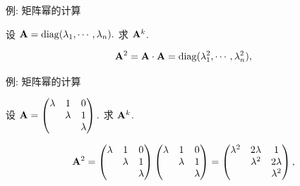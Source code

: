 \begin{frame}{例: 矩阵幂的计算}
	\onslide<+->
	\begin{example}
		设
		${\mathbf{A}}={\mathrm{diag}}(\lambda_1,\cdots,\lambda_n).$
		求 ${\mathbf{A}}^k$.
	\end{example}
	\onslide<+->
	\begin{solution}
		\[{\mathbf{A}}^2={\mathbf{A}}\cdot{\mathbf{A}}={\mathrm{diag}}(\lambda_1^2,\cdots,\lambda_n^2),\]
		\onslide<+->{%
			\[\bfA^3=\bfA\cdot\bfA^2=\diag(\lambda_1^3,\cdots,\lambda_n^3),\]
		}\onslide<+->{%
			递推下去可知
			\[\bfA^k=\diag(\lambda_1^k,\cdots,\lambda_n^k).\]
		}
	\end{solution}
\end{frame}


\begin{frame}{例: 矩阵幂的计算}\small
\beqskip{0pt}
	\onslide<+->
	\begin{example}
		设 ${\mathbf{A}}=\begin{pmatrix}
			\lambda&1&0\\
			&\lambda&1\\
			&&\lambda
		\end{pmatrix}.$
		求 ${\mathbf{A}}^k$.
	\end{example}
	\onslide<+->
	\begin{solution}
		\[{\mathbf{A}}^2=\begin{pmatrix}
			\lambda&1&0\\
			&\lambda&1\\
			&&\lambda
		\end{pmatrix}\begin{pmatrix}
			\lambda&1&0\\
			&\lambda&1\\
			&&\lambda
		\end{pmatrix}=\begin{pmatrix}
			\lambda^2&2\lambda&1\\
			&\lambda^2&2\lambda\\
			&&\lambda^2
		\end{pmatrix},\]
		\onslide<+->{%
			\[\bfA^3=\begin{pmatrix}
				\lambda&1&0\\
				&\lambda&1\\
				&&\lambda
			\end{pmatrix}\begin{pmatrix}
				\lambda^2&2\lambda&1\\
				&\lambda^2&2\lambda\\
				&&\lambda^2
			\end{pmatrix}=\begin{pmatrix}

\end{pmatrix}\]}
\end{solution}
\end{frame}
